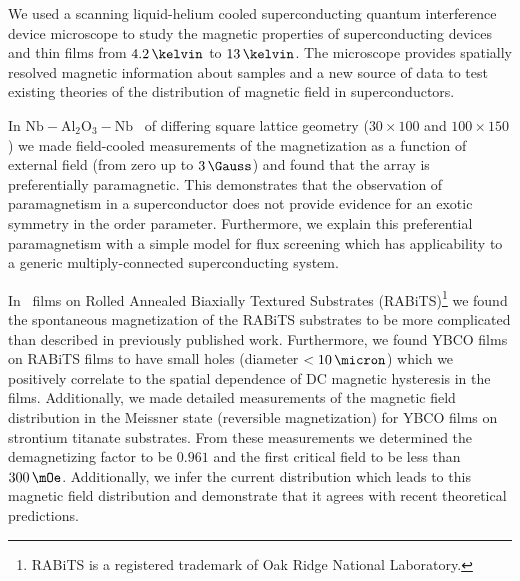 
We used a scanning liquid-helium cooled 
superconducting quantum interference
device microscope to study the magnetic properties
of superconducting devices and thin films from $4.2\,\kelvin$ to 
$13\,\kelvin$. 
The microscope provides spatially resolved magnetic information
about samples and a new source of data to test 
existing theories of the distribution of magnetic field in
superconductors. 

In $\mathrm{Nb}-\mathrm{Al}_2\mathrm{O}_3-\mathrm{Nb}$ \jjas\ of differing
square lattice geometry ($30\times 100$ and $100 \times 150$)
we made field-cooled measurements of the magnetization as a function
of external field (from zero up to $3\,\Gauss$) and
found that the array is preferentially paramagnetic. 
This demonstrates that the observation of paramagnetism in a superconductor
does not provide evidence for an exotic symmetry in the order 
parameter.
Furthermore, we explain
this preferential paramagnetism
with a simple  model for flux screening which has applicability to 
a generic multiply-connected superconducting system. 

In \ybco\ films on 
Rolled Annealed Biaxially Textured Substrates 
(RABiTS\trademark)\footnote{RABiTS is a registered trademark of
Oak Ridge National Laboratory.} we found the spontaneous 
magnetization of the 
RABiTS substrates to be more complicated than described in 
previously published work.
Furthermore, we found YBCO films on RABiTS films to have small holes 
(diameter $<10\,\micron$) which we positively 
correlate to the spatial dependence of DC magnetic hysteresis
in the films. 
Additionally, we made detailed measurements 
of the magnetic field
distribution in the Meissner state (reversible magnetization) for
YBCO films on strontium titanate substrates. From
these measurements we determined the demagnetizing factor
to be $0.961$ and the 
first critical field to be 
less than $300\,\mOe$. Additionally, we infer the current
distribution which leads to this magnetic field distribution and 
demonstrate that it agrees with recent theoretical predictions. 
